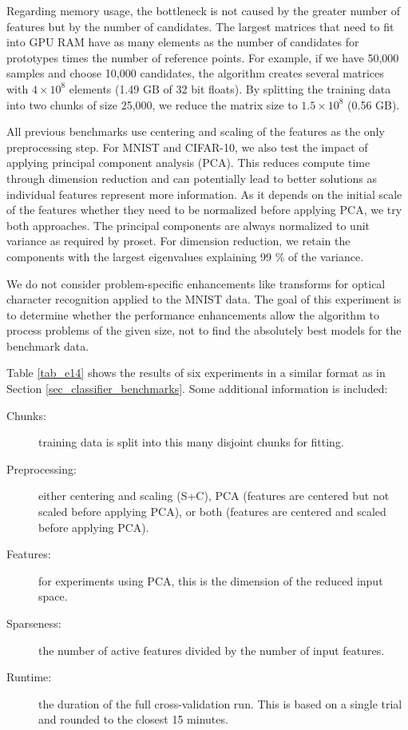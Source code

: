 %
Regarding memory usage, the bottleneck is not caused by the greater number of features but by the number of candidates.
The largest matrices that need to fit into GPU RAM have as many elements as the number of candidates for prototypes times the number of reference points.
For example, if we have 50,000 samples and choose 10,000 candidates, the algorithm creates several matrices with $4\times10^8$ elements (1.49 GB of 32 bit floats).
By splitting the training data into two chunks of size 25,000, we reduce the matrix size to $1.5\times10^8$ (0.56 GB).\par
%
All previous benchmarks use centering and scaling of the features as the only preprocessing step.
For MNIST and CIFAR-10, we also test the impact of applying principal component analysis (PCA).
This reduces compute time through dimension reduction and can potentially lead to better solutions as individual features represent more information.
As it depends on the initial scale of the features whether they need to be normalized before applying PCA, we try both approaches.
The principal components are always normalized to unit variance as required by proset.
For dimension reduction, we retain the components with the largest eigenvalues explaining 99 \% of the variance.
%
\begin{remark}
We do not consider problem-specific enhancements like transforms for optical character recognition applied to the MNIST data.
The goal of this experiment is to determine whether the performance enhancements allow the algorithm to process problems of the given size, not to find the absolutely best models for the benchmark data.
\end{remark}
%
Table \ref{tab_e14} shows the results of six experiments in a similar format as in Section \ref{sec_classifier_benchmarks}.
Some additional information is included:
%
\begin{description}
\item[Chunks:] training data is split into this many disjoint chunks for fitting.
%
\item[Preprocessing:] either centering and scaling (S+C), PCA (features are centered but not scaled before applying PCA), or both (features are centered and scaled before applying PCA).
%
\item[Features:] for experiments using PCA, this is the dimension of the reduced input space.
%
\item[Sparseness:] the number of active features divided by the number of input features.
%
\item[Runtime:] the duration of the full cross-validation run.
This is based on a single trial and rounded to the closest 15 minutes.
\end{description}
